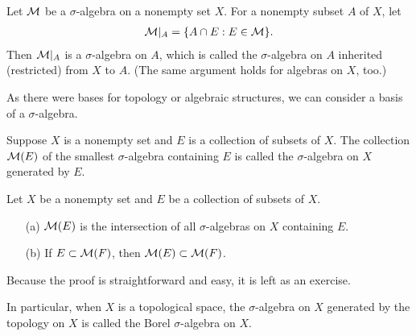 \begin{exmp}
    Let ${\mathcal{M}}$ be a $\sigma$-algebra on a nonempty set $X$.
    For a nonempty subset $A$ of $X$, let
    \begin{align*}
        {\mathcal{M}}|_A=\{A\cap E: E\in{\mathcal{M}}\}.
    \end{align*}
    Then ${\mathcal{M}}|_A$ is a $\sigma$-algebra on $A$, which is called the $\sigma$-algebra on $A$ inherited (restricted) from $X$ to $A$.
    (The same argument holds for algebras on $X$, too.)
\end{exmp}

As there were bases for topology or algebraic structures, we can consider a basis of a $\sigma$-algebra.
\begin{defi}
    Suppose $X$ is a nonempty set and $E$ is a collection of subsets of $X$.
    The collection ${\mathcal{M}}(E)$ of the smallest $\sigma$-algebra containing $E$ is called the $\sigma$-algebra on $X$ generated by $E$.
\end{defi}
\begin{rmk}
    Let $X$ be a nonempty set and $E$ be a collection of subsets of $X$.
    \begin{enumerate}
        \item[(a)]
        {
            ${\mathcal{M}}(E)$ is the intersection of all $\sigma$-algebras on $X$ containing $E$.
        }
        \item[(b)]
        {
            If $E\subset{\mathcal{M}}(F)$, then ${\mathcal{M}}(E)\subset{\mathcal{M}}(F)$.
        }
    \end{enumerate}
    Because the proof is straightforward and easy, it is left as an exercise.
\end{rmk}

In particular, when $X$ is a topological space, the $\sigma$-algebra on $X$ generated by the topology on $X$ is called the Borel $\sigma$-algebra on $X$.

